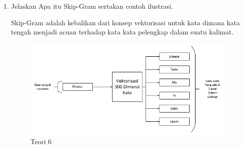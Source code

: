 \begin{enumerate}
\item Jelaskan Apa itu Skip-Gram sertakan contoh ilustrasi. \par
Skip-Gram adalah kebalikan dari konsep vektorisasi untuk kata dimana kata tengah menjadi acuan terhadap kata kata pelengkap dalam suatu kalimat.

\begin{figure}[ht]
\centering
\includegraphics[scale=0.6]{figures/1174075/5/1,6.PNG}
\caption{Teori 6}
\label{contoh}
\end{figure}

\end{enumerate}
